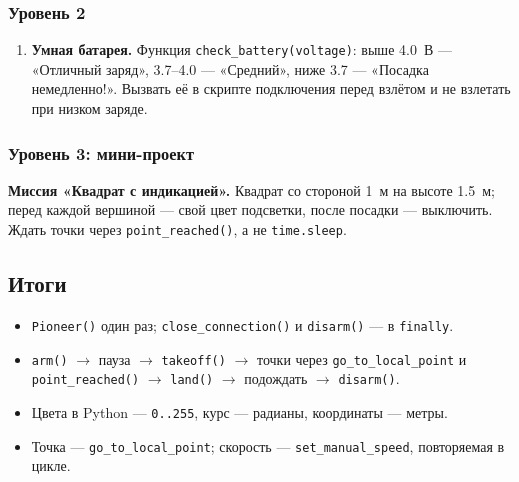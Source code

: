 \subsubsection*{Уровень 2}
\begin{enumerate}
    \item \textbf{Умная батарея.} Функция \verb|check_battery(voltage)|: выше 4.0~В --- «Отличный заряд», 3.7--4.0 --- «Средний», ниже 3.7 --- «Посадка немедленно!». Вызвать её в скрипте подключения перед взлётом и не взлетать при низком заряде.
\end{enumerate}

\subsubsection*{Уровень 3: мини-проект}
\textbf{Миссия «Квадрат с индикацией».} Квадрат со стороной 1~м на высоте 1.5~м; перед каждой вершиной --- свой цвет подсветки, после посадки --- выключить. Ждать точки через \verb|point_reached()|, а не \verb|time.sleep|.

\subsection*{Итоги}
\begin{itemize}
    \item \verb|Pioneer()| один раз; \verb|close_connection()| и \verb|disarm()| --- в \verb|finally|.
    \item \verb|arm()| $\to$ пауза $\to$ \verb|takeoff()| $\to$ точки через \verb|go_to_local_point| и \verb|point_reached()| $\to$ \verb|land()| $\to$ подождать $\to$ \verb|disarm()|.
    \item Цвета в Python --- \verb|0..255|, курс --- радианы, координаты --- метры.
    \item Точка --- \verb|go_to_local_point|; скорость --- \verb|set_manual_speed|, повторяемая в цикле.
\end{itemize}
